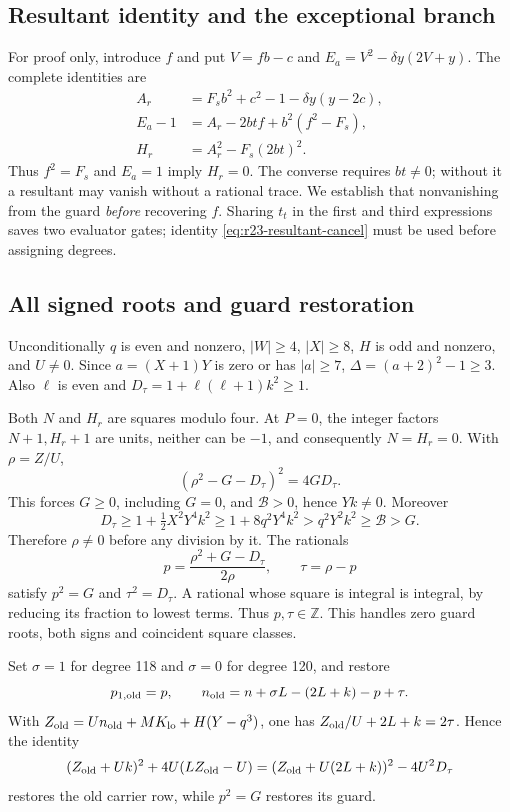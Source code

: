 \subsection{Resultant identity and the exceptional branch}
For proof only, introduce $f$ and put $V=fb-c$ and
$E_a=V^2-\delta y(2V+y)$. The complete identities are
\begin{align}
 A_r&=F_sb^2+c^2-1-\delta y(y-2c),\label{eq:r23-resultant-cancel}\\
 E_a-1&=A_r-2btf+b^2(f^2-F_s),\label{eq:r23-resultant-linear}\\
 H_r&=A_r^2-F_s(2bt)^2.\label{eq:r23-resultant-norm}
\end{align}
Thus $f^2=F_s$ and $E_a=1$ imply $H_r=0$. The converse requires
$bt\ne0$; without it a resultant may vanish without a rational trace.
We establish that nonvanishing from the guard \emph{before} recovering $f$.
Sharing $t_t$ in the first and third expressions saves two evaluator gates;
identity \eqref{eq:r23-resultant-cancel} must be used before assigning degrees.

\subsection{All signed roots and guard restoration}
Unconditionally $q$ is even and nonzero, $|W|\ge4$, $|X|\ge8$, $H$ is odd and
nonzero, and $U\ne0$. Since $a=(X+1)Y$ is zero or has $|a|\ge7$,
$\Delta=(a+2)^2-1\ge3$. Also $\ell$ is even and
$D_\tau=1+\ell(\ell+1)k^2\ge1$.

Both $N$ and $H_r$ are squares modulo four. At $P=0$, the integer factors
$N+1,H_r+1$ are units, neither can be $-1$, and consequently $N=H_r=0$.
With $\rho=Z/U$,
\[
 (\rho^2-G-D_\tau)^2=4GD_\tau.
\]
This forces $G\ge0$, including $G=0$, and $\mathcal B>0$, hence $Yk\ne0$.
Moreover
\[
 D_\tau\ge1+\tfrac12X^2Y^4k^2
 \ge1+8q^2Y^4k^2>q^2Y^2k^2\ge\mathcal B>G.
\]
Therefore $\rho\ne0$ before any division by it. The rationals
\[
 p=\frac{\rho^2+G-D_\tau}{2\rho},\qquad \tau=\rho-p
\]
satisfy $p^2=G$ and $\tau^2=D_\tau$. A rational whose square is integral is
integral, by reducing its fraction to lowest terms. Thus $p,\tau\in\mathbb Z$.
This handles zero guard roots, both signs and coincident square classes.

Set $\sigma=1$ for degree 118 and $\sigma=0$ for degree 120, and restore
\[
 p_{1,\rm old}=p,\qquad
 n_{\rm old}=n+\sigma L-(2L+k)-p+\tau.
\]
With $Z_{\rm old}=Un_{\rm old}+MK_{\rm lo}+H(Y-q^3)$, one has
$Z_{\rm old}/U+2L+k=2\tau$. Hence the identity
\[
 (Z_{\rm old}+Uk)^2+4U(LZ_{\rm old}-U)
  =(Z_{\rm old}+U(2L+k))^2-4U^2D_\tau
\]
restores the old carrier row, while $p^2=G$ restores its guard.

